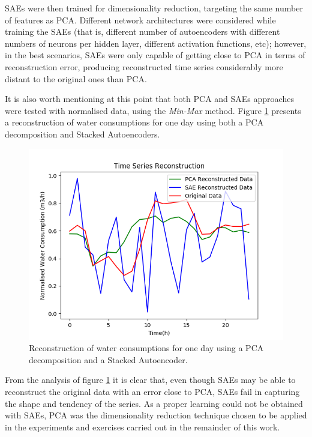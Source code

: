 \documentclass[9pt,journal,compsoc]{IEEEtran}
\begin{document}
SAEs were then trained for dimensionality reduction, targeting the same number of features as PCA. Different network architectures were considered while training the SAEs (that is, different number of autoencoders with different numbers of neurons per hidden layer, different activation functions, etc); however, in the best scenarios, SAEs were only capable of getting close to PCA in terms of reconstruction error, producing reconstructed time series considerably more distant to the original ones than PCA.

It is also worth mentioning at this point that both PCA and SAEs approaches were tested with normalised data, using the \emph{Min-Max} method. Figure \ref{day3_reconstruction} presents a reconstruction of water consumptions for one day using both a PCA decomposition and Stacked Autoencoders.

\begin{figure}[ht]
	\centering
	\includegraphics[scale=0.5]{images/pca_sae_day3.png}
	\caption{Reconstruction of water consumptions for one day using a PCA decomposition and a Stacked Autoencoder.}
	\label{day3_reconstruction}
\end{figure}

From the analysis of figure \ref{day3_reconstruction} it is clear that, even though SAEs may be able to reconstruct the original data with an error close to PCA, SAEs fail in capturing the shape and tendency of the series. As a proper learning could not be obtained with SAEs, PCA was the dimensionality reduction technique chosen to be applied in the experiments and exercises carried out in the remainder of this work.
\end{document}
